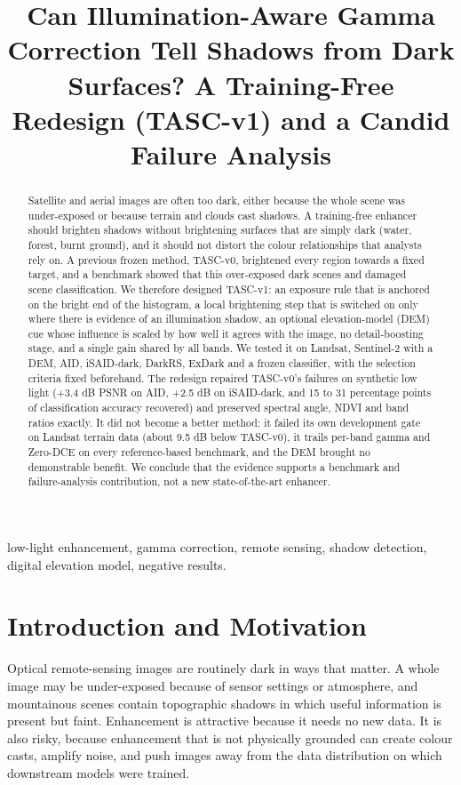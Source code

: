 \documentclass[conference]{IEEEtran}
\begin{document}
\title{Can Illumination-Aware Gamma Correction Tell Shadows from Dark Surfaces? A Training-Free Redesign (TASC-v1) and a Candid Failure Analysis}
\author{}
\maketitle
\begin{abstract}
Satellite and aerial images are often too dark, either because the whole scene was under-exposed or because terrain and clouds cast shadows. A training-free enhancer should brighten shadows without brightening surfaces that are simply dark (water, forest, burnt ground), and it should not distort the colour relationships that analysts rely on. A previous frozen method, TASC-v0, brightened every region towards a fixed target, and a benchmark showed that this over-exposed dark scenes and damaged scene classification. We therefore designed TASC-v1: an exposure rule that is anchored on the bright end of the histogram, a local brightening step that is switched on only where there is evidence of an illumination shadow, an optional elevation-model (DEM) cue whose influence is scaled by how well it agrees with the image, no detail-boosting stage, and a single gain shared by all bands. We tested it on Landsat, Sentinel-2 with a DEM, AID, iSAID-dark, DarkRS, ExDark and a frozen classifier, with the selection criteria fixed beforehand. The redesign repaired TASC-v0's failures on synthetic low light (+3.4 dB PSNR on AID, +2.5 dB on iSAID-dark, and 15 to 31 percentage points of classification accuracy recovered) and preserved spectral angle, NDVI and band ratios exactly. It did not become a better method: it failed its own development gate on Landsat terrain data (about 9.5 dB below TASC-v0), it trails per-band gamma and Zero-DCE on every reference-based benchmark, and the DEM brought no demonstrable benefit. We conclude that the evidence supports a benchmark and failure-analysis contribution, not a new state-of-the-art enhancer.
\end{abstract}
\begin{IEEEkeywords}
low-light enhancement, gamma correction, remote sensing, shadow detection, digital elevation model, negative results.
\end{IEEEkeywords}
\section{Introduction and Motivation}
Optical remote-sensing images are routinely dark in ways that matter. A whole image may be under-exposed because of sensor settings or atmosphere, and mountainous scenes contain topographic shadows in which useful information is present but faint. Enhancement is attractive because it needs no new data. It is also risky, because enhancement that is not physically grounded can create colour casts, amplify noise, and push images away from the data distribution on which downstream models were trained.
\end{document}
